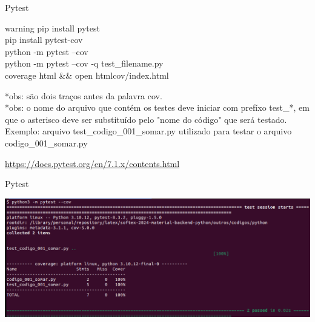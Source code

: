 \begin{frame}[t]{Pytest}
	
	\vspace{3em}
	\begin{beamercolorbox}[wd=\textwidth]{warning}
		pip install pytest\\
		\vspace{1em}
		pip install pytest-cov\\
		\vspace{1em}
		python -m pytest --cov\\
		\vspace{1em}
		python -m pytest --cov -q test\_filename.py\\
		\vspace{1em}
		coverage html \&\& open htmlcov/index.html
	\end{beamercolorbox}
	\vspace{1em}
	*obs: são dois traços antes da palavra cov.\\
	*obs: o nome do arquivo que contém os testes deve iniciar com prefíxo test\_*, em que o asterisco deve ser substituído pelo "nome do código" que será testado. Exemplo: arquivo test\_codigo\_001\_somar.py utilizado para testar o arquivo codigo\_001\_somar.py
	
	\vspace{3em}
	\url{https://docs.pytest.org/en/7.1.x/contents.html}
	
\end{frame}


\begin{frame}[t]{Pytest}
	
	\vspace{3em}
	\centering
	\includegraphics[scale=0.35]{imagens/fig-test-result-sample.png}
	
\end{frame}


